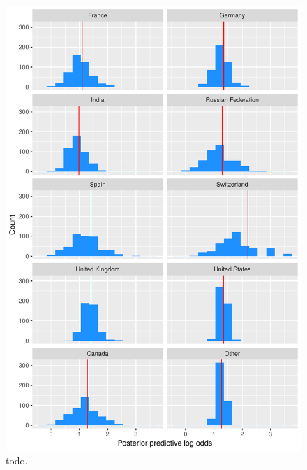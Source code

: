 \documentclass[9pt]{article}
\begin{document}
\begin{figure}[H]
\centering
\includegraphics{report-010}
\caption{todo.}\label{fig_1}
\end{figure}
\end{document}
